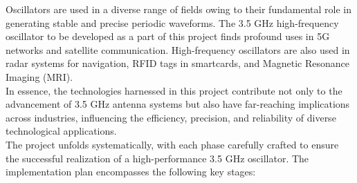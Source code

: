 \documentclass[]{extarticle}
\begin{document}

Oscillators are used in a diverse range of fields owing to their fundamental role in generating stable and precise periodic waveforms. The 3.5 GHz high-frequency oscillator to be developed as a part of this project finds profound uses in 5G networks and satellite communication. High-frequency oscillators are also used in radar systems for navigation, RFID tags in smartcards, and Magnetic Resonance Imaging (MRI). \\

In essence, the technologies harnessed in this project contribute not only to the advancement of 3.5 GHz antenna systems but also have far-reaching implications across industries, influencing the efficiency, precision, and reliability of diverse technological applications. \\

The project unfolds systematically, with each phase carefully crafted to ensure the successful realization of a high-performance 3.5 GHz oscillator. The implementation plan encompasses the following key stages:
\end{document}
